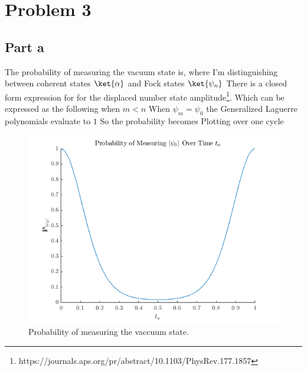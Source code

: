 \section*{Problem 3}
\subsection*{Part a}
The probability of measuring the vacuum state is, where I'm distinguishing between coherent states $\ket{\alpha}$ and Fock states $\ket{\psi_n}$
There is a closed form expression for for the displaced number state amplitude\footnote{https://journals.aps.org/pr/abstract/10.1103/PhysRev.177.1857}. Which can be expressed as the following when $m < n$
When $\psi_m = \psi_0$ the Generalized Laguerre polynomials evaluate to $1$
So the probability becomes
Plotting over one cycle
\begin{figure}[h]
    \centering
    \includegraphics[width=0.75\linewidth]{Resources//245//Homework 5/245 Homework 5 Problem 3a.png}
    \caption{Probability of measuring the vaccuum state.}
    \label{fig:enter-label}
\end{figure}
